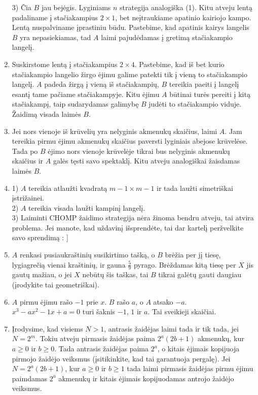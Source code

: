 \begin{enumerate}
3) Čia $B$ jau bejėgis. Lyginiams $n$ strategija analogiška (1). Kitu
atveju lentą padaliname į stačiakampius $2\times 1$, bet neįtraukiame
apatinio kairiojo kampo. Lentą nuspalviname įprastiniu būdu. Pastebime,
kad apatinis kairys langelis $B$ yra nepasiekiamas, tad $A$ laimi
pajudėdamas į gretimą stačiakampio langelį.
\item
Suskirstome lentą į stačiakampius  $2\times 4$. Pastebime, kad iš bet
kurio stačiakampio langelio žirgo ėjimu galime patekti tik į vieną to
stačiakampio langelį. $A$ padeda žirgą į vieną iš stačiakampių, $B$ tereikia
paeiti į langelį esantį tame pačiame stačiakampyje. Kitu ėjimu $A$ būtinai
turės pereiti į kitą stačiakampį, taip sudarydamas galimybę $B$ judėti to
stačiakampio viduje. Žaidimą visada laimės $B$.
\item
 Jei nors vienoje iš krūvelių yra nelyginis akmenukų skaičius, laimi $A$.
 Jam tereikia pirmu ėjimu akmenukų skaičius paversti lyginiais abejose
 krūvelėse. Tada po $B$ ėjimo nors vienoje krūvelėje tikrai bus nelyginis
 akmenukų skaičius ir $A$ galės tęsti savo spektaklį. Kitu atveju
 analogiškai žaisdamas laimės $B$. 
\item
1) $A$ tereikia atlaužti kvadratą $ m-1\times m-1 $ ir tada laužti
simetriškai įstrižainei.\\
2) $A$ tereikia visada laužti kampinį langelį.\\
3) Laiminti CHOMP žaidimo strategija nėra žinoma bendru atveju, tai atvira
problema. Jei manote, kad uždavinį išsprendėte, tai dar kartelį
peržvelkite savo sprendimą : ] 
\item
$A$ renkasi pusiaukraštinių susikirtimo tašką, o $B$ brėžia per jį tiesę,
lygiagrečią vienai kraštinių, ir gauna $\frac{5}{9}$ pyrago. Brėždamas kitą
tiesę per $X$ jis gautų mažiau, o jei $X$ nebūtų šis taškas, tai $B$ tikrai
galėtų gauti daugiau (įrodykite tai geometriškai). 
\item
$A$ pirmu ėjimu rašo $-1$ prie $x$. $B$ rašo $a$, o $A$ atsako $-a$. $x^3-a x^2-1
x+a=0$ turi šaknis $-1$, $1$ ir $a$. Tai sveikieji skaičiai.
\item
Įrodysime, kad visiems $N>1$, antrasis žaidėjas laimi tada ir tik tada,
jei $N=2^m$. Tokiu atveju pirmasis žaidėjas paima $2^a(2b+1)$ akmenukų,
kur $a\geq 0$ ir $b\geq 0$. Tada antrasis žaidėjas paima $2^a$, o kitais
ėjimais kopijuoja pirmojo žaidėjo veiksmus (įsitikinkite, kad tai
garantuoja pergalę). Jei $N=2^a(2b+1)$, kur $a\geq 0$ ir $b\geq 1$ tada
laimi pirmasis žaidėjas pirmu ėjimu paimdamas $2^a$ akmenukų ir kitais
ėjimais kopijuodamas antrojo žaidėjo veiksmus.

\end{enumerate}
